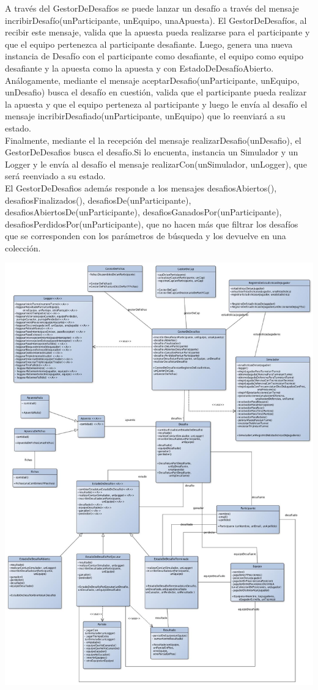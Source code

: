 A través del GestorDeDesafíos se puede lanzar un desafío a través del mensaje incribirDesafío(unParticipante, unEquipo, unaApuesta). El GestorDeDesafíos, al recibir este mensaje, valida que la apuesta pueda realizarse para el participante y que el equipo pertenezca al participante desafiante. Luego, genera una nueva instancia de Desafío con el participante como desafiante, el equipo como equipo desafiante y la apuesta como la apuesta y con EstadoDeDesafíoAbierto.\\
Análogamente, mediante el mensaje aceptarDesafio(unParticipante, unEquipo, unDesafio) busca el desafío en cuestión, valida que el participante pueda realizar la apuesta y que el equipo perteneza al participante y luego le envía al desafío el mensaje incribirDesafiado(unParticipante, unEquipo) que lo reenviará a su estado.\\
Finalmente, mediante el la recepción del mensaje realizarDesafio(unDesafio), el GestorDeDesafios busca el desafío.Si lo encuenta, instancia un Simulador y un Logger y le envía al desafío el mensaje realizarCon(unSimulador, unLogger), que será reenviado a su estado.\\

El GestorDeDesafios además responde a los mensajes desafiosAbiertos(), desafiosFinalizados(), desafiosDe(unParticipante), desafiosAbiertosDe(unParticipante), desafiosGanadosPor(unParticipante), desafiosPerdidosPor(unParticipante), que no hacen más que filtrar los desafíos que se corresponden con los parámetros de búsqueda y los devuelve en una colección.\\

\begin{center}
\includegraphics[scale=0.35]{diseno/gestionDeDesafios.jpg}
\end{center}